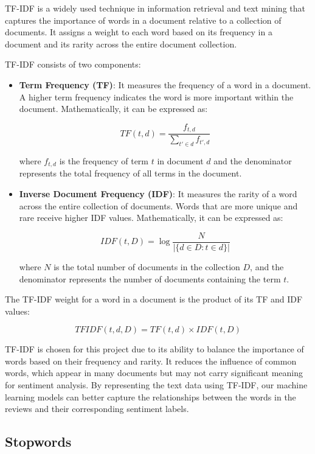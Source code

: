 \documentclass{article}
\begin{document}
TF-IDF is a widely used technique in information retrieval and text mining that captures the importance of words in a document relative to a collection of documents. It assigns a weight to each word based on its frequency in a document and its rarity across the entire document collection.

TF-IDF consists of two components:

\begin{itemize}
\item \textbf{Term Frequency (TF)}: It measures the frequency of a word in a document. A higher term frequency indicates the word is more important within the document. Mathematically, it can be expressed as:


   $$ TF(t, d) = \frac{f_{t, d}}{\sum_{t' \in d} f_{t', d}}$$


where $f_{t, d}$ is the frequency of term $t$ in document $d$ and the denominator represents the total frequency of all terms in the document.

\item \textbf{Inverse Document Frequency (IDF)}: It measures the rarity of a word across the entire collection of documents. Words that are more unique and rare receive higher IDF values. Mathematically, it can be expressed as:

    $$IDF(t, D) = \log \frac{N}{|\{d \in D : t \in d\}|}$$


where $N$ is the total number of documents in the collection $D$, and the denominator represents the number of documents containing the term $t$.

\end{itemize}

The TF-IDF weight for a word in a document is the product of its TF and IDF values:


$$TFIDF(t, d, D) = TF(t, d) \times IDF(t, D)$$


TF-IDF is chosen for this project due to its ability to balance the importance of words based on their frequency and rarity. It reduces the influence of common words, which appear in many documents but may not carry significant meaning for sentiment analysis. By representing the text data using TF-IDF, our machine learning models can better capture the relationships between the words in the reviews and their corresponding sentiment labels.

\subsection{Stopwords}
\end{document}
